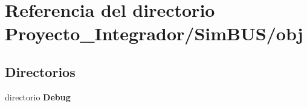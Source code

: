 \section{Referencia del directorio Proyecto\-\_\-\-Integrador/\-Sim\-B\-U\-S/obj}
\label{dir_6e2afb37bfe8465e803f812ca32b68df}
\subsection*{Directorios}
\begin{DoxyCompactItemize}
\item 
directorio {\bf Debug}
\end{DoxyCompactItemize}
